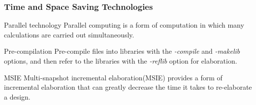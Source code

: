 \documentclass{beamer}
\begin{document}
\begin{frame}
  \frametitle{Time and Space Saving Technologies}
  \begin{block}{Parallel technology}
    Parallel computing is a form of computation in which many calculations are carried out simultaneously.
  \end{block}

  \begin{block}{Pre-compilation}
    Pre-compile files into libraries with the \textit{-compile} and \textit{-makelib} options, and then refer to the libraries with the \textit{-reflib} option for elaboration.
  \end{block}

  \begin{block}{MSIE}
    Multi-snapshot incremental elaboration(MSIE) provides a form of incremental elaboration that can greatly decrease the time it takes to re-elaborate a design.
  \end{block}
\end{frame}

\end{document}
